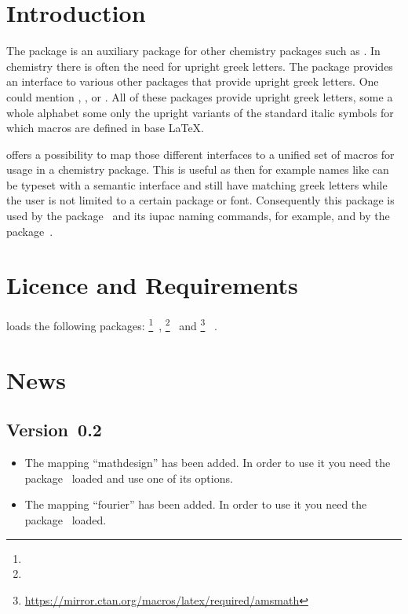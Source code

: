 \documentclass[load-preamble+]{cnltx-doc}
\begin{document}

\listoftables

\section{Introduction}
The \chemgreek{} package is an auxiliary package for other chemistry packages
such as .  In chemistry there is often the need for upright
greek letters.  The \chemgreek{} package provides an interface to various
other packages that provide upright greek letters.  One could mention
, ,  or .  All of these
packages provide upright greek letters, some a whole alphabet some only the
upright variants of the standard italic symbols for which macros are defined
in base \LaTeX.

\chemgreek{} offers a possibility to map those different interfaces to a
unified set of macros for usage in a chemistry package.  This is useful as
then for example names like  can be typeset
with a semantic interface and still have matching greek letters while the user
is not limited to a certain package or font.  Consequently this package is
used by the  package~\cite{pkg:chemmacros} and its \acs{iupac}
naming commands, for example, and by the 
package~\cite{pkg:chemnum}.

\section{Licence and Requirements}
\license

\chemgreek{} loads the following packages:
\footnote{}~\cite{bnd:l3kernel},
\footnote{}~\cite{bnd:l3packages} and
\footnote{\url{https://mirror.ctan.org/macros/latex/required/amsmath}}%
~\cite{pkg:amstext}.

\section{News}
\subsection{Version~0.2}
\begin{itemize}
  \item The mapping ``mathdesign'' has been added.  In order to use it you
    need the  package~\cite{pkg:mathdesign} loaded and use one
    of its options.
  \item The mapping ``fourier'' has been added.  In order to use it you
    need the  package~\cite{pkg:fourier} loaded.
\end{itemize}
\end{document}
